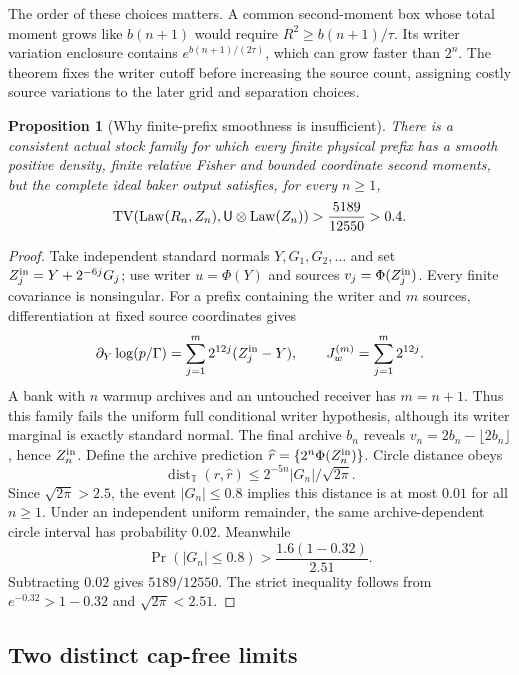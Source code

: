 \documentclass[11pt]{article}
\numberwithin{equation}{section}
\newtheorem{proposition}[theorem]{Proposition}
\theoremstyle{definition}
\theoremstyle{remark}
\begin{document}
The order of these choices matters. A common second-moment box whose
total moment grows like $b(n+1)$ would require
$R^2\geq b(n+1)/\tau$. Its writer variation enclosure contains
$e^{b(n+1)/(2\tau)}$, which can grow faster than $2^n$. The theorem fixes
the writer cutoff before increasing the source count, assigning costly
source variations to the later grid and separation choices.

\begin{proposition}[Why finite-prefix smoothness is insufficient]
\label{p1p:prop:prefixcounter}
There is a consistent actual stock family for which every finite
physical prefix has a smooth positive density, finite relative Fisher
and bounded coordinate second moments, but the complete ideal baker
output satisfies, for every $n\geq1$,
\[
 \operatorname{TV}(\operatorname{Law}(R_n,Z_n),\mathsf U\otimes\operatorname{Law}(Z_n))>
 \frac{5189}{12550}>0.4.
\]
\end{proposition}
\begin{proof}
Take independent standard normals $Y,G_1,G_2,\ldots$ and set
$Z_j^{\rm in}=Y+2^{-6j}G_j$; use writer $u=\Phi(Y)$ and sources
$v_j=\Phi(Z_j^{\rm in})$. Every finite covariance is nonsingular.
For a prefix containing the writer and $m$ sources, differentiation at
fixed source coordinates gives
\[
 \partial_Y\log(p/\Gamma)=\sum_{j=1}^m2^{12j}(Z_j^{\rm in}-Y),
 \qquad J_w^{(m)}=\sum_{j=1}^m2^{12j}.
\]
A bank with $n$ warmup archives and an untouched receiver has $m=n+1$.
Thus this family fails the uniform full conditional writer hypothesis,
although its writer marginal is exactly standard normal.
The final archive $b_n$ reveals $v_n=2b_n-\lfloor2b_n\rfloor$, hence
$Z_n^{\rm in}$. Define the archive prediction
$\widehat r=\{2^n\Phi(Z_n^{\rm in})\}$.
Circle distance obeys
\[
 \operatorname{dist}_{\mathbb T}(r,\widehat r)
 \leq 2^{-5n}|G_n|/\sqrt{2\pi}.
\]
Since $\sqrt{2\pi}>2.5$, the event $|G_n|\leq0.8$ implies this distance
is at most $0.01$ for all $n\geq1$. Under an independent uniform
remainder, the same archive-dependent circle interval has probability
$0.02$. Meanwhile
\[
 \Pr(|G_n|\leq0.8)
 >\frac{1.6(1-0.32)}{2.51}.
\]
Subtracting $0.02$ gives $5189/12550$. The strict inequality follows
from $e^{-0.32}>1-0.32$ and $\sqrt{2\pi}<2.51$.
\end{proof}

\subsection{Two distinct cap-free limits}
\end{document}
